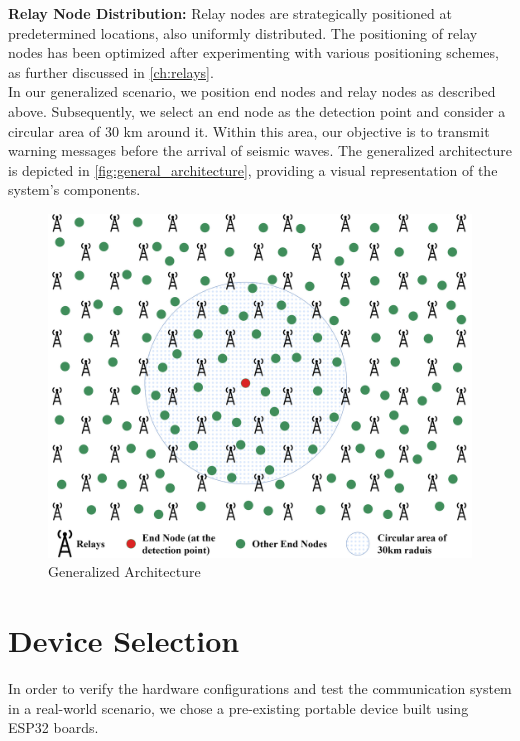 \noindent\textbf{Relay Node Distribution:} Relay nodes are strategically positioned at predetermined locations, also uniformly distributed. The positioning of relay nodes has been optimized after experimenting with various positioning schemes, as further discussed in \autoref{ch:relays}.\\

In our generalized scenario, we position end nodes and relay nodes as described above. Subsequently, we select an end node as the detection point and consider a circular area of 30 km around it. Within this area, our objective is to transmit warning messages before the arrival of seismic waves. The generalized architecture is depicted in \autoref{fig:general_architecture}, providing a visual representation of the system's components.\\

\begin{figure}[ht!]
    \centering
    \includegraphics[width=0.8\linewidth]{images/generalarchitecture.png}
    \caption{Generalized Architecture}
    \label{fig:general_architecture}
\end{figure}

\section{Device Selection}\label{ch:device}

\hspace{12pt} In order to verify the hardware configurations and test the communication system in a real-world scenario, we chose a pre-existing portable device built using ESP32 boards.

